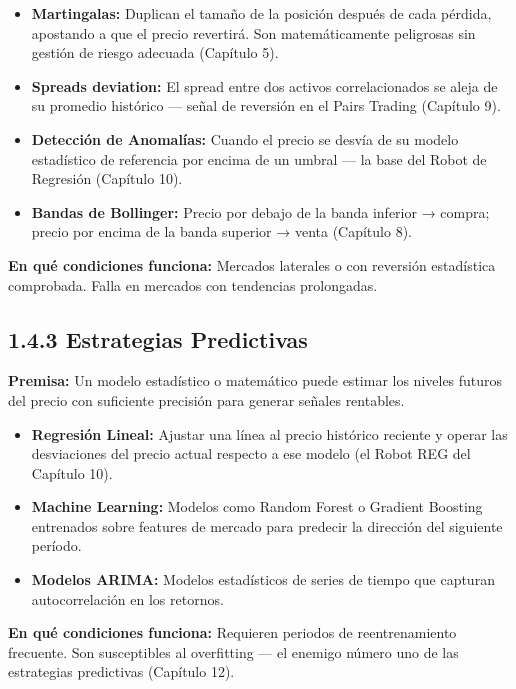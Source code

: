 \documentclass[12pt, a4paper, twoside, openright]{book}
\providecommand{\tightlist}{%
  \setlength{\itemsep}{2pt}\setlength{\parskip}{0pt}}
\renewenvironment{quote}{%
  \begin{mdframed}[style=quotestyle]%
  \itshape\color{bkblue}%
}{%
  \end{mdframed}%
}
\numberwithin{figure}{chapter}
\numberwithin{table}{chapter}
\begin{document}
\begin{itemize}
\tightlist
\item
  \textbf{Martingalas:} Duplican el tamaño de la posición después de
  cada pérdida, apostando a que el precio revertirá. Son matemáticamente
  peligrosas sin gestión de riesgo adecuada (Capítulo 5).
\item
  \textbf{Spreads deviation:} El spread entre dos activos
  correlacionados se aleja de su promedio histórico --- señal de
  reversión en el Pairs Trading (Capítulo 9).
\item
  \textbf{Detección de Anomalías:} Cuando el precio se desvía de su
  modelo estadístico de referencia por encima de un umbral --- la base
  del Robot de Regresión (Capítulo 10).
\item
  \textbf{Bandas de Bollinger:} Precio por debajo de la banda inferior →
  compra; precio por encima de la banda superior → venta (Capítulo 8).
\end{itemize}

\begin{quote}
\textbf{En qué condiciones funciona:} Mercados laterales o con reversión
estadística comprobada. Falla en mercados con tendencias prolongadas.
\end{quote}

\subsection{1.4.3 Estrategias
Predictivas}\label{estrategias-predictivas}

\textbf{Premisa:} Un modelo estadístico o matemático puede estimar los
niveles futuros del precio con suficiente precisión para generar señales
rentables.

\begin{itemize}
\tightlist
\item
  \textbf{Regresión Lineal:} Ajustar una línea al precio histórico
  reciente y operar las desviaciones del precio actual respecto a ese
  modelo (el Robot REG del Capítulo 10).
\item
  \textbf{Machine Learning:} Modelos como Random Forest o Gradient
  Boosting entrenados sobre features de mercado para predecir la
  dirección del siguiente período.
\item
  \textbf{Modelos ARIMA:} Modelos estadísticos de series de tiempo que
  capturan autocorrelación en los retornos.
\end{itemize}

\begin{quote}
\textbf{En qué condiciones funciona:} Requieren periodos de
reentrenamiento frecuente. Son susceptibles al overfitting --- el
enemigo número uno de las estrategias predictivas (Capítulo 12).
\end{quote}
\end{document}
